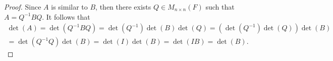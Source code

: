 \begin{Exercise}
	\begin{proof}
		Since $A$ is similar to $B$, then there exists $Q\in M_{n\times n}(F)$ such that $A = Q^{-1} B Q$. It follows that 
		\begin{gather*}
		\det(A) = \det(Q^{-1} B Q) = \det(Q^{-1})\det(B)\det(Q) = (\det(Q^{-1})\det(Q))\det(B) \\
		= \det(Q^{-1}Q)\det(B) = \det(I)\det(B) = \det(I B) = \det(B).
		\end{gather*}
	\end{proof}
\end{Exercise}